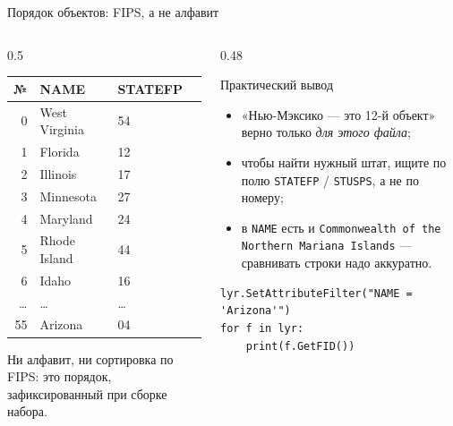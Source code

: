 \documentclass[aspectratio=169,10pt]{beamer}
\begin{document}
\begin{frame}[fragile]{Порядок объектов: FIPS, а не алфавит}
\footnotesize
\begin{columns}[T,onlytextwidth]
  \begin{column}{0.5\textwidth}
    \begin{tabular}{@{}rllc@{}}
      \toprule
      № & NAME & STATEFP & \\
      \midrule
      0  & West Virginia  & 54 & \\
      1  & Florida        & 12 & \\
      2  & Illinois       & 17 & \\
      3  & Minnesota      & 27 & \\
      4  & Maryland       & 24 & \\
      5  & Rhode Island   & 44 & \\
      6  & Idaho          & 16 & \\
      \dots & \dots & \dots & \\
      55 & Arizona        & 04 & \\
      \bottomrule
    \end{tabular}
    \vspace{0.4em}
    {\scriptsize Ни алфавит, ни сортировка по FIPS: это порядок,
     зафиксированный при сборке набора.}
  \end{column}
  \begin{column}{0.48\textwidth}
    \begin{block}{Практический вывод}\small
      \begin{itemize}\itemsep1pt
        \item «Нью-Мэксико --- это 12-й объект» верно только
              \emph{для этого файла};
        \item чтобы найти нужный штат, ищите по полю
              \texttt{STATEFP} / \texttt{STUSPS}, а не по номеру;
        \item в \texttt{NAME} есть и \texttt{Commonwealth of the Northern
              Mariana Islands} --- сравнивать строки надо аккуратно.
      \end{itemize}
    \end{block}
    \vspace{0.3em}
    \begin{Verbatim}[numbers=none,fontsize=\scriptsize]
lyr.SetAttributeFilter("NAME = 'Arizona'")
for f in lyr:
    print(f.GetFID())
\end{Verbatim}
  \end{column}
\end{columns}
\end{frame}
\end{document}
